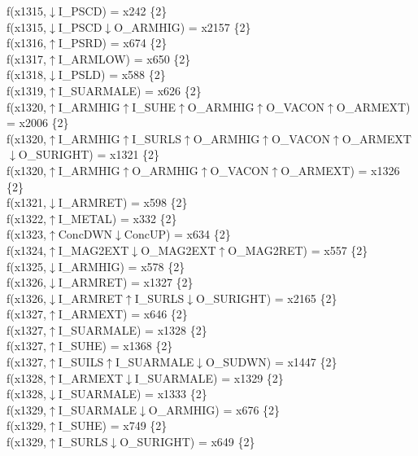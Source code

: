 f(x1315,$\downarrow$I\_PSCD) = x242 \{2\} \\  
f(x1315,$\downarrow$I\_PSCD$\downarrow$O\_ARMHIG) = x2157 \{2\} \\  
f(x1316,$\uparrow$I\_PSRD) = x674 \{2\} \\  
f(x1317,$\uparrow$I\_ARMLOW) = x650 \{2\} \\  
f(x1318,$\downarrow$I\_PSLD) = x588 \{2\} \\  
f(x1319,$\uparrow$I\_SUARMALE) = x626 \{2\} \\  
f(x1320,$\uparrow$I\_ARMHIG$\uparrow$I\_SUHE$\uparrow$O\_ARMHIG$\uparrow$O\_VACON$\uparrow$O\_ARMEXT) = x2006 \{2\} \\  
f(x1320,$\uparrow$I\_ARMHIG$\uparrow$I\_SURLS$\uparrow$O\_ARMHIG$\uparrow$O\_VACON$\uparrow$O\_ARMEXT$\downarrow$O\_SURIGHT) = x1321 \{2\} \\  
f(x1320,$\uparrow$I\_ARMHIG$\uparrow$O\_ARMHIG$\uparrow$O\_VACON$\uparrow$O\_ARMEXT) = x1326 \{2\} \\  
f(x1321,$\downarrow$I\_ARMRET) = x598 \{2\} \\  
f(x1322,$\uparrow$I\_METAL) = x332 \{2\} \\  
f(x1323,$\uparrow$ConcDWN$\downarrow$ConcUP) = x634 \{2\} \\  
f(x1324,$\uparrow$I\_MAG2EXT$\downarrow$O\_MAG2EXT$\uparrow$O\_MAG2RET) = x557 \{2\} \\  
f(x1325,$\downarrow$I\_ARMHIG) = x578 \{2\} \\  
f(x1326,$\downarrow$I\_ARMRET) = x1327 \{2\} \\  
f(x1326,$\downarrow$I\_ARMRET$\uparrow$I\_SURLS$\downarrow$O\_SURIGHT) = x2165 \{2\} \\  
f(x1327,$\uparrow$I\_ARMEXT) = x646 \{2\} \\  
f(x1327,$\uparrow$I\_SUARMALE) = x1328 \{2\} \\  
f(x1327,$\uparrow$I\_SUHE) = x1368 \{2\} \\  
f(x1327,$\uparrow$I\_SUILS$\uparrow$I\_SUARMALE$\downarrow$O\_SUDWN) = x1447 \{2\} \\  
f(x1328,$\uparrow$I\_ARMEXT$\downarrow$I\_SUARMALE) = x1329 \{2\} \\  
f(x1328,$\downarrow$I\_SUARMALE) = x1333 \{2\} \\  
f(x1329,$\uparrow$I\_SUARMALE$\downarrow$O\_ARMHIG) = x676 \{2\} \\  
f(x1329,$\uparrow$I\_SUHE) = x749 \{2\} \\  
f(x1329,$\uparrow$I\_SURLS$\downarrow$O\_SURIGHT) = x649 \{2\} \\  
